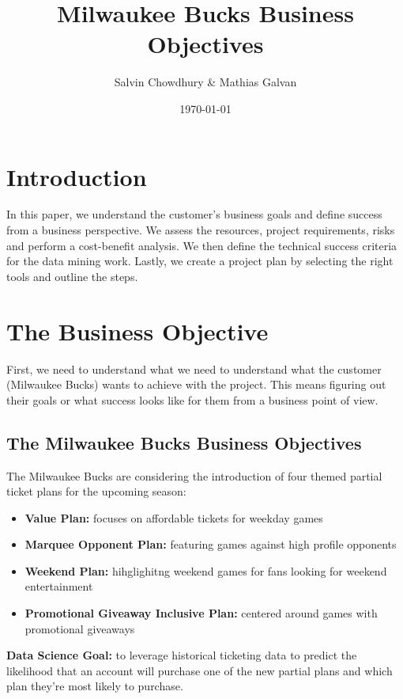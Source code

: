 \documentclass[a4paper]{article}
\title{Milwaukee Bucks Business Objectives}
\author{Salvin Chowdhury \& Mathias Galvan}
\date{\today}
\begin{document}
\maketitle 

\newpage

\section{Introduction}
In this paper, we understand the customer's business goals and define success from a business perspective. We assess 
the resources, project requirements, risks and perform a cost-benefit analysis. We then define the technical success 
criteria for the data mining work. Lastly, we create a project plan by selecting the right tools and outline the steps.

\section{The Business Objective}
First, we need to understand what we need to understand what the customer (Milwaukee Bucks) wants to achieve with the 
project. This means figuring out their goals or what success looks like for them from a business point of view.

\subsection{The Milwaukee Bucks Business Objectives}
The Milwaukee Bucks are considering the introduction of four themed partial ticket plans for the upcoming season:
\begin{itemize}
    \item \textbf{Value Plan:} focuses on affordable tickets for weekday games
    \item \textbf{Marquee Opponent Plan:} featuring games against high profile opponents
    \item \textbf{Weekend Plan:} hihglighitng weekend games for fans looking for weekend entertainment
    \item \textbf{Promotional Giveaway Inclusive Plan:} centered around games with promotional giveaways
\end{itemize}

\noindent \textbf{Data Science Goal:} to leverage historical ticketing data to predict the likelihood that an account 
will purchase one of the new partial plans and which plan they're most likely to purchase. \\
\end{document}

